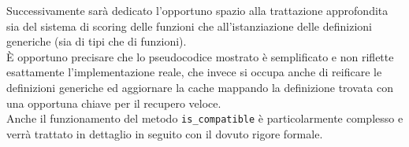 Successivamente sarà dedicato l'opportuno spazio alla trattazione approfondita sia del sistema di scoring 
delle funzioni che all'istanziazione delle definizioni generiche (sia di tipi che di funzioni). \\

È opportuno precisare che lo pseudocodice mostrato è semplificato e non riflette esattamente l'implementazione
reale, che invece si occupa anche di reificare le definizioni generiche ed aggiornare la cache mappando 
la definizione trovata con una opportuna chiave per il recupero veloce. \\

Anche il funzionamento del metodo \texttt{is\_compatible} è particolarmente complesso e verrà trattato
in dettaglio in seguito con il dovuto rigore formale. \\